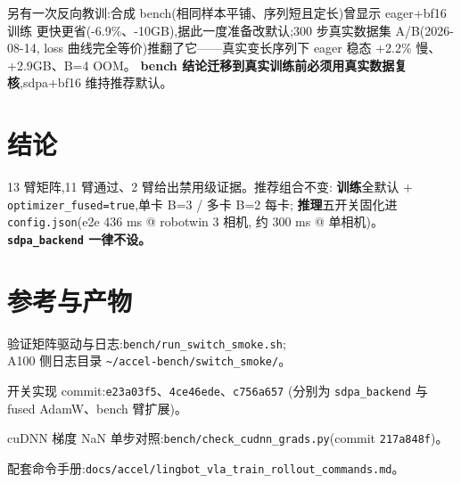 \documentclass[11pt]{ctexart}
\begin{document}
另有一次反向教训:合成 bench(相同样本平铺、序列短且定长)曾显示 eager+bf16 训练
更快更省(-6.9\%、-10GB),据此一度准备改默认;300 步真实数据集 A/B(2026-08-14,
loss 曲线完全等价)推翻了它——真实变长序列下 eager 稳态 +2.2\% 慢、+2.9GB、B=4 OOM。
\textbf{bench 结论迁移到真实训练前必须用真实数据复核},sdpa+bf16 维持推荐默认。

\section{结论}
13 臂矩阵,11 臂通过、2 臂给出禁用级证据。推荐组合不变:
\textbf{训练}全默认 + \texttt{optimizer\_fused=}\allowbreak\texttt{true},单卡 B=3 / 多卡 B=2 每卡;
\textbf{推理}五开关固化进 \texttt{config.json}(e2e 436 ms @ robotwin 3 相机,
约 300 ms @ 单相机)。\textbf{\texttt{sdpa\_backend} 一律不设。}

\section*{参考与产物}
\begin{enumerate}[label={[\arabic*]},leftmargin=2.2em]
\item 验证矩阵驱动与日志:\texttt{bench/run\_switch\_smoke.sh};\\
A100 侧日志目录 \texttt{\textasciitilde/accel-bench/switch\_smoke/}。
\item 开关实现 commit:\texttt{e23a03f5}\allowbreak、\texttt{4ce46ede}\allowbreak、\texttt{c756a657}
(分别为 \texttt{sdpa\_backend} 与 fused AdamW、bench 臂扩展)。
\item cuDNN 梯度 NaN 单步对照:\texttt{bench/check\_cudnn\_}\allowbreak\texttt{grads.py}(commit \texttt{217a848f})。
\item 配套命令手册:\texttt{docs/accel/}\allowbreak\texttt{lingbot\_vla\_train\_rollout\_commands.md}。
\end{enumerate}
\end{document}
